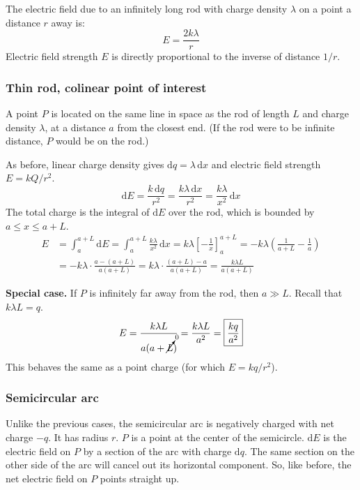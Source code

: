 \documentclass{article}
\newcommand{\theorem}[2]{\begin{tcolorbox}[title={#1},colback=blue!5!white,colframe=blue!75!black,parbox=false] #2 \end{tcolorbox}}
\begin{document}
\theorem{Electric field due to infinitely long rod}{
	The electric field due to an infinitely long rod with charge density $\lambda$ on a point a distance $r$ away is:
	\begin{equation*}
	    E=\frac{2k\lambda}{r}
	\end{equation*}
	Electric field strength $E$ is directly proportional to the inverse of distance $1/r$.
}

\subsubsection{Thin rod, colinear point of interest}

A point $P$ is located on the same line in space as the rod of length $L$ and charge density $\lambda$, at a distance $a$ from the closest end. (If the rod were to be infinite distance, $P$ would be on the rod.)

As before, linear charge density gives $\mathrm{d}q=\lambda \,\mathrm{d}x$ and electric field strength $E=kQ/r^2$.
\begin{equation*}
	\mathrm{d}E
	=\frac{k \,\mathrm{d}q}{r^2}
	=\frac{k\lambda \,\mathrm{d}x}{r^2}
	=\frac{k\lambda}{x^2} \,\mathrm{d}x
\end{equation*}
The total charge is the integral of $\mathrm{d}E$ over the rod, which is bounded by $a\leq x\leq a+L$.
\begin{align*}
    E
	&=\int_{a}^{a+L}\mathrm{d}E
	=\int_{a}^{a+L}\frac{k\lambda}{x^2}\,\mathrm{d}x
	=k\lambda \left[-\frac 1x\right]_{a}^{a+L}
	=-k\lambda \left( \frac{1}{a+L}-\frac{1}{a} \right) \\
	&=-k\lambda\cdot \frac{a-(a+L)}{a(a+L)}
	=k\lambda\cdot \frac{(a+L)-a}{a(a+L)}
	=\boxed{\frac{k\lambda L}{a(a+L)}}
\end{align*}

\textbf{Special case.} If $P$ is infinitely far away from the rod, then $a\gg L$. Recall that $k\lambda L=q$.
\begin{equation*}
    E
	=\frac{k\lambda L}{a(a+\cancelto0L)}
	=\frac{k\lambda L}{a^2}
	=\boxed{\frac{kq}{a^2}}
\end{equation*}
This behaves the same as a point charge (for which $E=kq/r^2$).

\subsubsection{Semicircular arc}

Unlike the previous cases, the semicircular arc is negatively charged with net charge $-q$. It has radius $r$. $P$ is a point at the center of the semicircle. $\mathrm{d}E$ is the electric field on $P$ by a section of the arc with charge $\mathrm{d}q$. The same section on the other side of the arc will cancel out its horizontal component. So, like before, the net electric field on $P$ points straight up.
\end{document}
